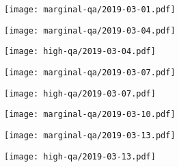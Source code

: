 \documentclass{article}
\begin{document}
\begin{figure}[H]
	\ContinuedFloat
	\centering
	\begin{subfigure}{\linewidth}
		\texttt{[image: marginal-qa/2019-03-01.pdf]}
	\end{subfigure}
	\begin{subfigure}{0.48\linewidth}
		\texttt{[image: marginal-qa/2019-03-04.pdf]}
	\end{subfigure}
	\begin{subfigure}{0.48\linewidth}
		\texttt{[image: high-qa/2019-03-04.pdf]}
	\end{subfigure}
	\begin{subfigure}{0.48\linewidth}
		\texttt{[image: marginal-qa/2019-03-07.pdf]}
	\end{subfigure}
	\begin{subfigure}{0.48\linewidth}
		\texttt{[image: high-qa/2019-03-07.pdf]}
	\end{subfigure}
	\begin{subfigure}{\linewidth}
		\texttt{[image: marginal-qa/2019-03-10.pdf]}
	\end{subfigure}
	\begin{subfigure}{0.48\linewidth}
		\texttt{[image: marginal-qa/2019-03-13.pdf]}
	\end{subfigure}
	\begin{subfigure}{0.48\linewidth}
		\texttt{[image: high-qa/2019-03-13.pdf]}
	\end{subfigure}
\end{figure}
\end{document}
